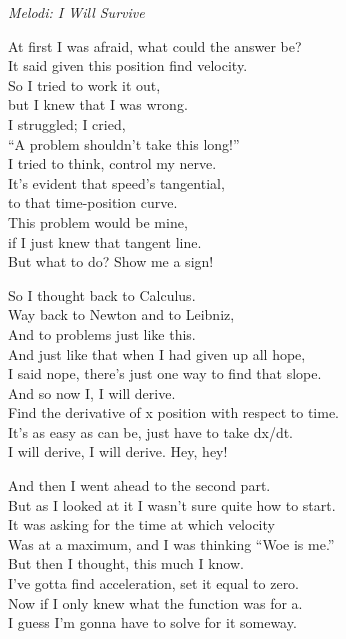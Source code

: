 {\footnotesize\textit{Melodi: I Will Survive}}\par
\vspace{10pt}
At first I was afraid, what could the answer be?\\
It said given this position find velocity.\\
So I tried to work it out,\\
but I knew that I was wrong.\\
I struggled; I cried,\\
``A problem shouldn't take this long!''\\
I tried to think, control my nerve.\\
It's evident that speed's tangential,\\
to that time-position curve.\\
This problem would be mine,\\
if I just knew that tangent line.\\
But what to do? Show me a sign!\par
\vspace{7pt}
So I thought back to Calculus.\\
Way back to Newton and to Leibniz,\\
And to problems just like this.\\
And just like that when I had given up all hope,\\
I said nope, there's just one way to find that slope.\\
And so now I, I will derive.\\
Find the derivative of x position with respect to time.\\
It's as easy as can be, just have to take dx/dt.\\
I will derive, I will derive. Hey, hey!\par
\newpage
And then I went ahead to the second part.\\
But as I looked at it I wasn't sure quite how to start.\\
It was asking for the time at which velocity\\
Was at a maximum, and I was thinking ``Woe is me.''\\
But then I thought, this much I know.\\
I've gotta find acceleration, set it equal to zero.\\
Now if I only knew what the function was for a.\\
I guess I'm gonna have to solve for it someway.\par
